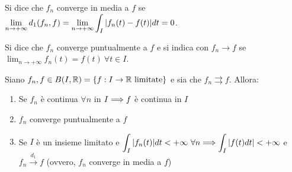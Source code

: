 \begin{definition}
    Si dice che $f_n$ converge in media a $f$ se $\displaystyle \lim_{n\to + \infty}d_1(f_n,f)=\lim_{n \to + \infty} \int_I\abs{f_n(t) - f(t)}dt = 0$.
\end{definition}

\begin{definition}
    Si dice che $f_n$ converge puntualmente a $f$ e si indica con $f_n \to f$ se $\displaystyle \lim_{n\to +\infty} f_n(t) = f(t) \ \forall t \in I$.
\end{definition}

\begin{theorem}
    Siano $f_n, f \in B(I, \mathbb{R}) = \{f: I \to \mathbb{R} \text{ limitate}\}$ e sia che $f_n \rightrightarrows f$. Allora:
    \begin{enumerate}
        \item Se $f_n$ è continua $\forall n$ in $I \Longrightarrow f$ è continua in $I$
        \item $f_n$ converge puntualmente a $f$
        \item Se $I$ è un insieme limitato e $\displaystyle \int_I\abs{f_n(t)}dt < + \infty \ \forall n \Longrightarrow \int_I\abs{f(t)dt} < +\infty$ e $f_n \xrightarrow{d_1} f$ (ovvero, $f_n$ converge in media a $f$)
    \end{enumerate}
\end{theorem}

